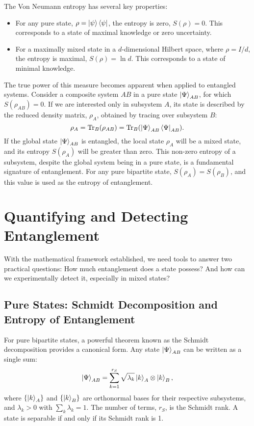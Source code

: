 The Von Neumann entropy has several key properties:
\begin{itemize}
	\item For any pure state, $\rho = \ket{\psi}\bra{\psi}$, the
		entropy is zero, $S(\rho) = 0$. This corresponds to a state of
		maximal knowledge or zero uncertainty.
	\item For a maximally mixed state in a $d$-dimensional Hilbert
		space, where $\rho = I/d$, the entropy is maximal,
		$S(\rho) = \ln d$. This corresponds to a state of minimal knowledge.
\end{itemize}

The true power of this measure becomes apparent when applied to entangled
systems. Consider a composite system $AB$ in a pure state
$\ket{\Psi}_{AB}$, for which $S(\rho_{AB})=0$. If we are interested only in
subsystem $A$, its state is described by the reduced density matrix,
$\rho_A$, obtained by tracing over subsystem $B$:
\begin{equation}
	\rho_A = \mathrm{Tr}_B(\rho_{AB}) = \mathrm{Tr}_B(\ket{\Psi}_{AB}\bra{\Psi}_{AB}).
\end{equation}
If the global state $\ket{\Psi}_{AB}$ is entangled, the local state $\rho_A$
will be a mixed state, and its entropy $S(\rho_A)$ will be greater than zero.
This non-zero entropy of a subsystem, despite the global system being in a
pure state, is a fundamental signature of entanglement. For any pure
bipartite state, $S(\rho_A) = S(\rho_B)$, and this value is used as the
entropy of entanglement.

\section{Quantifying and Detecting Entanglement}
\label{sec:quantifying_detecting}

With the mathematical framework established, we need tools to answer two
practical questions: How much entanglement does a state possess? And how can
we experimentally detect it, especially in mixed states?

\subsection{Pure States: Schmidt Decomposition and Entropy of Entanglement}
\label{sub:pure_state_measures}

For pure bipartite states, a powerful theorem known as the
Schmidt decomposition provides a canonical form. Any state
$\ket{\Psi}_{AB}$ can be written as a single sum:
\begin{equation}
	\ket{\Psi}_{AB} = \sum_{k=1}^{r_S} \sqrt{\lambda_k} \ket{k}_A \otimes \ket{k}_B,
\end{equation}
where $\{\ket{k}_A\}$ and $\{\ket{k}_B\}$ are orthonormal bases for their
respective subsystems, and $\lambda_k > 0$ with $\sum_k \lambda_k = 1$. The
number of terms, $r_S$, is the Schmidt rank. A state is separable if
and only if its Schmidt rank is 1.

